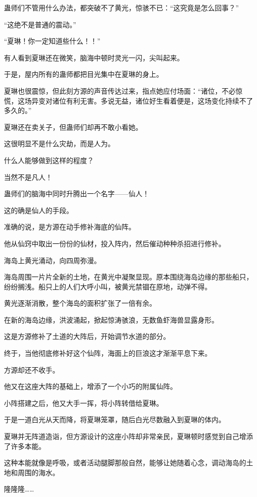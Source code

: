 \begin{this_body}
蛊师们不管用什么办法，都突破不了黄光，惊骇不已：“这究竟是怎么回事？”

“这绝不是普通的震动。”

“夏琳！你一定知道些什么！！”

有人看到夏琳还在微笑，脑海中顿时灵光一闪，尖叫起来。

于是，屋内所有的蛊师都把目光集中在夏琳的身上。

夏琳也很震惊，但此刻方源的声音传达过来，指点她应付场面：“诸位，不必惊慌，这场异变对诸位有利无害。多说无益，诸位好生看着便是，这场变化持续不了多久的。”

夏琳还在卖关子，但蛊师们却再不敢小看她。

这很明显不是什么灾劫，而是人为。

什么人能够做到这样的程度？

当然不是凡人！

蛊师们的脑海中同时升腾出一个名字——仙人！

这的确是仙人的手段。

准确的说，是方源在动手修补海底的仙阵。

他从仙窍中取出一份份的仙材，投入阵内，然后催动种种杀招进行修补。

海岛上黄光涌动，向四周弥漫。

海岛周围一片片全新的土地，在黄光中凝聚显现。原本围绕海岛边缘的那些船只，纷纷搁浅。船只上的人们大呼小叫，被黄光禁锢在原地，动弹不得。

黄光逐渐消散，整个海岛的面积扩张了一倍有余。

在新的海岛边缘，洪波涌起，掀起惊涛骇浪，无数鱼虾海兽显露身形。

这是方源修补了土道的大阵后，开始调节水道的部分。

终于，当他彻底修补好这个仙阵，海面上的巨浪这才渐渐平息下来。

方源却还不收手。

他又在这座大阵的基础上，增添了一个小巧的附属仙阵。

小阵搭建之后，他又大手一挥，将小阵转借给夏琳。

于是一道白光从天而降，将夏琳笼罩，随后白光尽数融入到夏琳的体内。

夏琳并无阵道造诣，但方源设计的这座小阵却非常亲民，夏琳顿时感觉到自己增添了许多本能。

这种本能就像是呼吸，或者活动腿脚那般自然，能够让她随着心念，调动海岛的土地和周围的海水。

隆隆隆……


\end{this_body}
